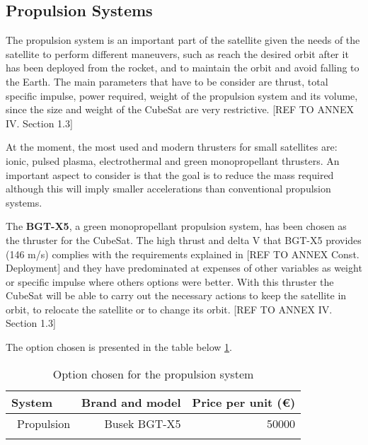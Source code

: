 \subsection{Propulsion Systems}
\label{ch:PropulsionSystems}
The propulsion system is an important part of the satellite given the needs of the satellite to perform different maneuvers, such as reach the desired orbit after it has been deployed from the rocket, and to maintain the orbit and avoid falling to the Earth. The main parameters that have to be consider are thrust, total specific impulse, power required, weight of the propulsion system and its volume, since the size and weight of the CubeSat are very restrictive. [{REF TO ANNEX IV. Section 1.3}]

At the moment, the most used and modern thrusters for small satellites are: ionic, pulsed plasma, electrothermal and green monopropellant thrusters. An important aspect to consider is that the goal is to reduce the mass required although this will imply smaller accelerations than conventional propulsion systems.

The \textbf{BGT-X5}, a green monopropellant propulsion system, has been chosen as the thruster for the CubeSat. The high thrust and delta V that BGT-X5 provides (146 m/s) complies with the requirements explained in [{REF TO ANNEX Const. Deployment}] and they have predominated at expenses of other variables as weight or specific impulse where others options were better. With this thruster the CubeSat will be able to carry out the necessary actions to keep the satellite in orbit, to relocate the satellite or to change its orbit. [{REF TO ANNEX IV. Section 1.3}]

The option chosen is presented in the table below \ref{propulsionfinal}.

\begin{longtable}{| l | r | r | }
\hline
\rowcolor[gray]{0.80}	\textbf{System} &  \textbf{Brand and model}     & \textbf{Price per unit (\euro)}   \\
\hline
\endfirsthead

	   ~Propulsion & Busek BGT-X5 & 50000 \\
	\hline

\caption{Option chosen for the propulsion system}
\label{propulsionfinal}
\end{longtable}